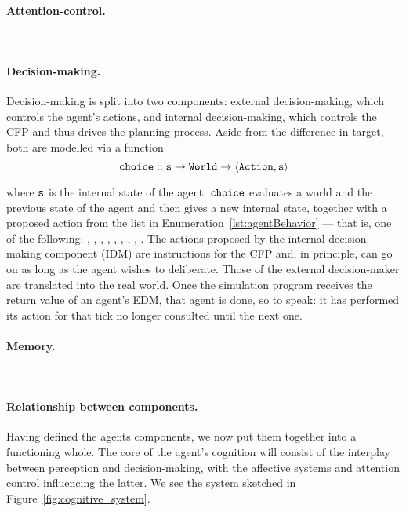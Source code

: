  

\paragraph{Attention-control.}\ \\


\paragraph{Decision-making.} Decision-making is split into two components: external decision-making, which controls the agent's actions, and internal decision-making, which controls the CFP and thus drives the planning process. Aside from the difference in target, both are modelled via a function
$$
	\mathtt{choice} :: \mathtt{s \rightarrow World \rightarrow \langle Action, s \rangle}
$$

where $\mathtt{s}$ is the internal state of the agent. $\mathtt{choice}$ evaluates a world and the previous state of the agent and then gives a new internal state, together with a proposed action from the list in Enumeration~\ref{lst:agentBehavior} --- that is, one of the following: , , , , , , , , . The actions proposed by the internal decision-making component (IDM) are instructions for the CFP and, in principle, can go on as long as the agent wishes to deliberate. Those of the external decision-maker are translated into the real world. Once the simulation program receives the return value of an agent's EDM, that agent is done, so to speak: it has performed its action for that tick no longer consulted until the next one.

\paragraph{Memory.}\ \\


\paragraph{Relationship between components.} Having defined the agents components, we now put them together into a functioning whole. The core of the agent's cognition will consist of the interplay between perception and decision-making, with the affective systems and attention control influencing the latter. We see the system sketched in Figure~\ref{fig:cognitive_system}.

